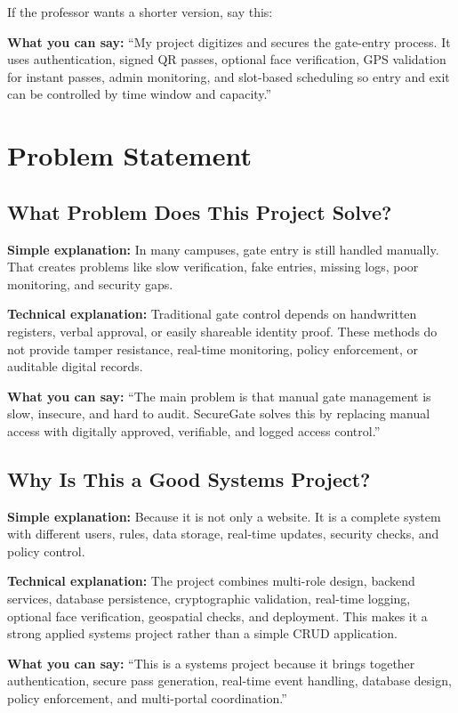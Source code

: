 \documentclass[12pt,letterpaper]{article}
\newcommand{\simple}[1]{\textbf{Simple explanation:} #1}
\newcommand{\technical}[1]{\textbf{Technical explanation:} #1}
\newcommand{\say}[1]{\textbf{What you can say:} ``#1''}
\begin{document}
If the professor wants a shorter version, say this:

\say{My project digitizes and secures the gate-entry process. It uses authentication, signed QR passes, optional face verification, GPS validation for instant passes, admin monitoring, and slot-based scheduling so entry and exit can be controlled by time window and capacity.}

\section{Problem Statement}

\subsection{What Problem Does This Project Solve?}

\simple{In many campuses, gate entry is still handled manually. That creates problems like slow verification, fake entries, missing logs, poor monitoring, and security gaps.}

\technical{Traditional gate control depends on handwritten registers, verbal approval, or easily shareable identity proof. These methods do not provide tamper resistance, real-time monitoring, policy enforcement, or auditable digital records.}

\say{The main problem is that manual gate management is slow, insecure, and hard to audit. SecureGate solves this by replacing manual access with digitally approved, verifiable, and logged access control.}

\subsection{Why Is This a Good Systems Project?}

\simple{Because it is not only a website. It is a complete system with different users, rules, data storage, real-time updates, security checks, and policy control.}

\technical{The project combines multi-role design, backend services, database persistence, cryptographic validation, real-time logging, optional face verification, geospatial checks, and deployment. This makes it a strong applied systems project rather than a simple CRUD application.}

\say{This is a systems project because it brings together authentication, secure pass generation, real-time event handling, database design, policy enforcement, and multi-portal coordination.}
\end{document}

